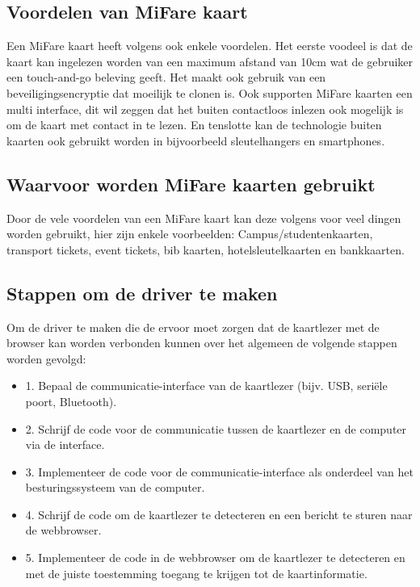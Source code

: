 \subsection{Voordelen van MiFare kaart}
Een MiFare kaart heeft volgens \textcite{Printplast} ook enkele voordelen. Het eerste voodeel is dat de kaart kan ingelezen worden van een maximum afstand van 10cm wat de gebruiker een touch-and-go beleving geeft.
Het maakt ook gebruik van een beveiligingsencryptie dat moeilijk te clonen is. Ook supporten MiFare kaarten een multi interface, dit wil zeggen dat het buiten contactloos inlezen ook mogelijk is om de kaart met contact in te lezen. En tenslotte kan de technologie buiten kaarten ook gebruikt worden in bijvoorbeeld sleutelhangers en smartphones.

\subsection{Waarvoor worden MiFare kaarten gebruikt}
Door de vele voordelen van een MiFare kaart kan deze volgens \textcite{Digitalid} voor veel dingen worden gebruikt, hier zijn enkele voorbeelden: Campus/studentenkaarten, transport tickets, event tickets, bib kaarten, hotelsleutelkaarten en bankkaarten.


\subsection{Stappen om de driver te maken}
Om de driver te maken die de ervoor moet zorgen dat de kaartlezer met de browser kan worden verbonden kunnen over het algemeen de volgende stappen worden gevolgd:
\begin{itemize}
    \item 1. Bepaal de communicatie-interface van de kaartlezer (bijv. USB, seriële poort, Bluetooth).
    \item 2. Schrijf de code voor de communicatie tussen de kaartlezer en de computer via de interface.
    \item 3. Implementeer de code voor de communicatie-interface als onderdeel van het besturingssysteem van de computer.
    \item 4. Schrijf de code om de kaartlezer te detecteren en een bericht te sturen naar de webbrowser.
    \item 5. Implementeer de code in de webbrowser om de kaartlezer te detecteren en met de juiste toestemming toegang te krijgen tot de kaartinformatie.
\end{itemize}

